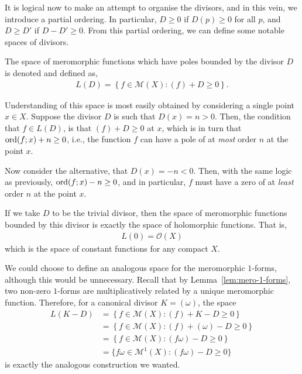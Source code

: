 It is logical now to make an attempt to organise the divisors, and in this vein,
we introduce a partial ordering. In particular, $ D \geq 0 $ if $ D(p) \geq 0
$ for all $ p $, and $ D \geq D' $ if $ D - D' \geq 0 $. From this partial
ordering, we can define some
notable spaces of divisors.

\begin{definition}
	The space of meromorphic functions which have poles bounded by the divisor $ D
	$ is denoted and defined as,
	\begin{align*}
		L(D) = \left\{ f \in \mathcal{M}(X): (f) + D \geq 0 \right\}.
	\end{align*}
\end{definition}

Understanding of this space is most easily obtained by considering a single
point $ x \in X $. Suppose the divisor $ D $ is such that $ D(x) = n > 0 $.
Then, the condition that $ f \in L(D) $, is that $ (f) + D \geq 0 $ at $ x $,
which is in turn that $ \operatorname{ord}(f;x) + n \geq 0 $, i.e., the function $ f $ can
have a pole of at \textit{most} order $ n $ at the point $ x $.

Now consider the alternative, that $ D(x) = -n < 0 $. Then, with the same
logic as previously, $ \operatorname{ord}(f;x) - n \geq 0 $, and in particular, $ f $ must
have a zero of at \textit{least} order $ n $ at the point $ x $.

\begin{remark}
	If we take $ D $ to be the trivial divisor, then the space of meromorphic
	functions bounded by this divisor is exactly the space of holomorphic
	functions. That is,
	\begin{align*}
		L(0) = \mathcal{O}(X)
	\end{align*}
	which is the space of constant functions for any compact $ X $.
\end{remark}

We could choose to define an analogous space for the meromorphic $ 1 $-forms,
although this would be unnecessary. Recall that by Lemma~\ref{lem:mero-1-forms},
two non-zero $ 1 $-forms are multiplicatively related by a unique meromorphic
function. Therefore, for a canonical divisor $ K= (\omega) $, the space
\begin{align*}
	L(K-D) & = \left\{ f \in \mathcal{M}(X): (f) + K - D \geq 0 \right\}        \\
	       & = \left\{ f \in \mathcal{M}(X): (f) + (\omega) - D \geq 0 \right\} \\
	       & = \left\{ f \in \mathcal{M}(X): (f \omega) - D \geq 0 \right\}     \\
	       & = \{ f \omega \in \mathcal{M}^{1}(X): (f \omega) - D \geq 0 \}
\end{align*}
is exactly the analogous construction we wanted.

